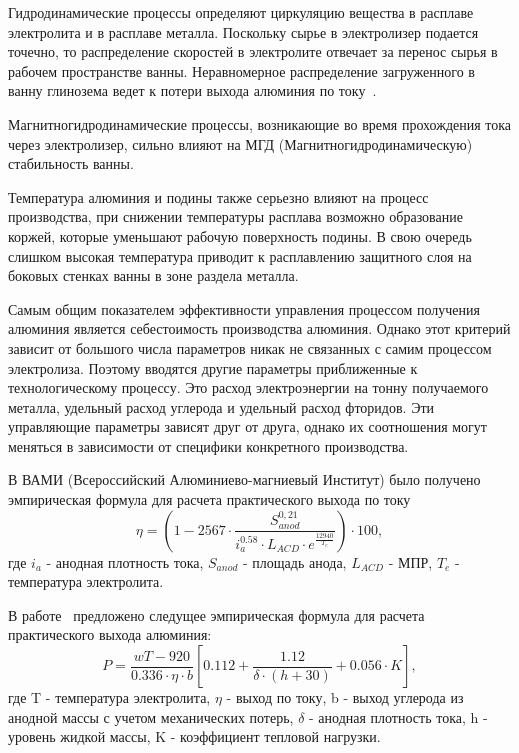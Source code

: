 \documentclass{article}
\begin{document}
Гидродинамические процессы определяют циркуляцию вещества в расплаве электролита и в расплаве металла. Поскольку сырье в электролизер подается точечно, то распределение скоростей в электролите отвечает за перенос сырья в рабочем пространстве ванны. Неравномерное распределение загруженного в ванну глинозема ведет к потери выхода алюминия по току~\cite{litink:AE}.

Магнитногидродинамические процессы, возникающие во время прохождения тока через электролизер, сильно влияют на МГД (Магнитногидродинамическую) стабильность ванны. 

Температура алюминия и подины также серьезно влияют на процесс производства, при снижении температуры расплава возможно образование коржей, которые уменьшают рабочую поверхность подины. В свою очередь слишком высокая температура приводит к расплавлению защитного слоя на боковых стенках ванны в зоне раздела металла.

Самым общим показателем эффективности управления процессом получения алюминия является себестоимость производства алюминия. Однако этот критерий зависит от большого числа параметров никак не связанных с самим процессом электролиза. Поэтому вводятся другие параметры приближенные к технологическому процессу. Это расход электроэнергии на тонну получаемого металла, удельный расход углерода и удельный расход фторидов. Эти управляющие параметры зависят друг от друга, однако их соотношения могут меняться в зависимости от специфики конкретного производства.

В ВАМИ (Всероссийский Алюминиево-магниевый Институт) было получено эмпирическая формула для расчета практического выхода по току~\cite{litlink:VAMI}
\begin{equation} \label{eq1}
\eta=(1-2567 \cdot \frac{S^{0,21}_{anod}}{i^{0.58}_a \cdot L_{ACD} \cdot e^{\frac{12940}{T_e}}}) \cdot 100,
\end{equation}
где $i_a$ - анодная плотность тока, $S_{anod}$ - площадь анода, $L_{ACD}$ - МПР, $T_e$ - температура электролита.

В работе~\cite{litlink:korobov} предложено следущее эмпирическая формула для расчета практического выхода алюминия:
\begin{equation} \label{eq:p}
P= \frac{wT-920}{0.336 \cdot \eta \cdot b}[0.112+\frac {1.12}{\delta \cdot (h+30)}+0.056 \cdot K],
\end{equation}
где T - температура электролита, $\eta$ - выход по току, b - выход углерода из анодной массы с учетом механических потерь, $\delta$ - анодная плотность тока, h - уровень жидкой массы, K - коэффициент тепловой нагрузки.
\end{document}
